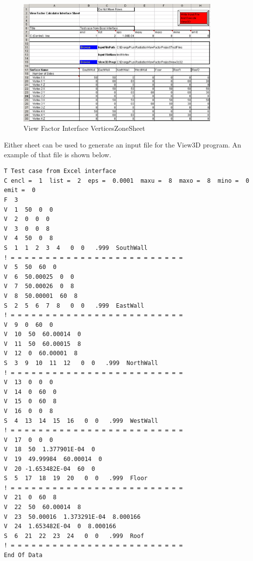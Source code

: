 \begin{figure}[hbtp] %
\centering
\includegraphics[width=0.9\textwidth, height=0.9\textheight, keepaspectratio=true]{media/image023.png}
\caption{View Factor Interface VerticesZoneSheet \protect \label{fig:view-factor-interface-verticeszonesheet}}
\end{figure}

Either sheet can be used to generate an input file for the View3D program. An example of that file is shown below.

\begin{lstlisting}
T Test case from Excel interface
C encl =  1  list =  2  eps =  0.0001  maxu =  8  maxo =  8  mino =  0  emit =  0
F  3
V  1  50  0  0
V  2  0  0  0
V  3  0  0  8
V  4  50  0  8
S  1  1  2  3  4   0  0   .999  SouthWall
! = = = = = = = = = = = = = = = = = = = = = = = = =
V  5  50  60  0
V  6  50.00025  0  0
V  7  50.00026  0  8
V  8  50.00001  60  8
S  2  5  6  7  8   0  0   .999  EastWall
! = = = = = = = = = = = = = = = = = = = = = = = = =
V  9  0  60  0
V  10  50  60.00014  0
V  11  50  60.00015  8
V  12  0  60.00001  8
S  3  9  10  11  12   0  0   .999  NorthWall
! = = = = = = = = = = = = = = = = = = = = = = = = =
V  13  0  0  0
V  14  0  60  0
V  15  0  60  8
V  16  0  0  8
S  4  13  14  15  16   0  0   .999  WestWall
! = = = = = = = = = = = = = = = = = = = = = = = = =
V  17  0  0  0
V  18  50  1.377901E-04  0
V  19  49.99984  60.00014  0
V  20 -1.653482E-04  60  0
S  5  17  18  19  20   0  0   .999  Floor
! = = = = = = = = = = = = = = = = = = = = = = = = =
V  21  0  60  8
V  22  50  60.00014  8
V  23  50.00016  1.373291E-04  8.000166
V  24  1.653482E-04  0  8.000166
S  6  21  22  23  24   0  0   .999  Roof
! = = = = = = = = = = = = = = = = = = = = = = = = =
End Of Data
\end{lstlisting}

